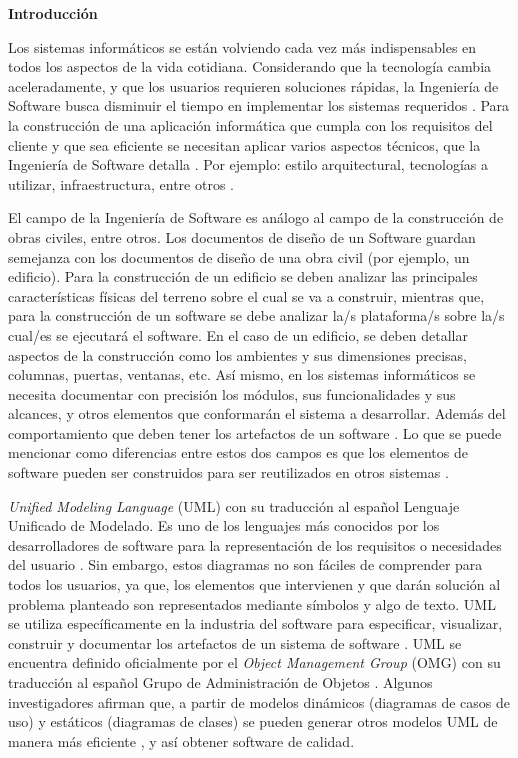 \begin{center}
	\textbf{ {\titulodc Introducción}}
\end{center}

Los sistemas informáticos se están volviendo cada vez más indispensables en todos los aspectos de la vida cotidiana. Considerando que la tecnología cambia aceleradamente, y que los usuarios requieren soluciones rápidas, la Ingeniería de Software busca disminuir el tiempo en implementar los sistemas requeridos \parencite{Panthi2022}. Para la construcción de una aplicación informática que cumpla con los requisitos del cliente y que sea eficiente se necesitan aplicar varios aspectos técnicos, que la Ingeniería de Software detalla \parencite{Chen2022}. Por ejemplo: estilo arquitectural, tecnologías a utilizar, infraestructura, entre otros \parencite{Kulesza2020}.

El campo de la Ingeniería de Software es análogo al campo de la construcción de obras civiles, entre otros. Los documentos de diseño de un Software guardan semejanza con los documentos de diseño de una obra civil (por ejemplo, un edificio). Para la construcción de un edificio se deben analizar las principales características físicas del terreno sobre el cual se va a construir, mientras que, para la construcción de un software se debe analizar la/s plataforma/s sobre la/s cual/es se ejecutará el software. En el caso de un edificio, se deben detallar aspectos de la construcción como los ambientes y sus dimensiones precisas, columnas, puertas, ventanas, etc. Así mismo, en los sistemas informáticos se necesita documentar con precisión los módulos, sus funcionalidades y sus alcances, y otros elementos que conformarán el sistema a desarrollar. Además del comportamiento que deben tener los artefactos de un software \parencite{Hamdi2022}. Lo que se puede mencionar como diferencias entre estos dos campos es que los elementos de software pueden ser construidos para ser reutilizados en otros sistemas \parencite{Guerra2021}.

\textit{Unified Modeling Language} (UML) con su traducción al español Lenguaje Unificado de Modelado. Es uno de los lenguajes más conocidos por los desarrolladores de software para la representación de los requisitos o necesidades del usuario \parencite{OMGUML24}. Sin embargo, estos diagramas no son fáciles de comprender para todos los usuarios, ya que, los elementos que intervienen y que darán solución al problema planteado son representados mediante símbolos y algo de texto. UML se utiliza específicamente en la industria del software para especificar, visualizar, construir y documentar los artefactos de un sistema de software \parencite{Bergstrom2022}. UML se encuentra definido oficialmente por el \textit{Object Management Group} (OMG) con su traducción al español Grupo de Administración de Objetos \parencite{Omg2009}. Algunos investigadores afirman que, a partir de modelos dinámicos (diagramas de casos de uso) y estáticos (diagramas de clases) se pueden generar otros modelos UML de manera más eficiente \parencite{Jahan2021}, y así obtener software de calidad.

